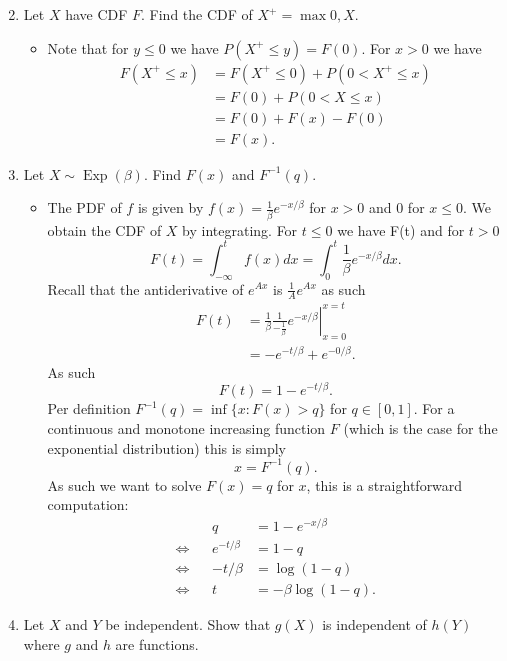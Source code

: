 \documentclass{article}
\begin{document}
\begin{enumerate}
\begin{itemize}
$$			$$
		\end{itemize}
	\item Let $X$ have CDF $F$. Find the CDF of $X^+ = \max{0, X}$.
		\begin{itemize}
			\item Note that for $y \leq 0$ we have $P(X^+ \leq y) = F(0)$. For $x > 0$ we have
			$$
			\begin{aligned}
			F(X^+ \leq x) &= F(X^+ \leq 0) + P(0 < X^+ \leq x) \\
			&= F(0) + P(0 < X \leq x) \\
			&= F(0) + F(x) - F(0) \\
			&= F(x).
			\end{aligned}
			$$
		\end{itemize}
	\item Let $X \sim \operatorname{Exp}(\beta)$. Find $F(x)$ and $F^{-1}(q)$.
		\begin{itemize}
			\item The PDF of $f$ is given by $f(x) = \frac{1}{\beta} e^{- x / \beta}$ for $x > 0$ and $0$ for $x \leq 0$. We obtain the CDF of $X$ by integrating. For $t \leq 0$ we have F(t) and for $t > 0$
			$$
			F(t) = \int_{-\infty}^t f(x) dx = \int_0^t \frac{1}{\beta} e^{-x / \beta} dx.
			$$
			Recall that the antiderivative of $e^{Ax}$ is $\frac{1}{A} e^{Ax}$ as such
			$$
			\begin{aligned}
			F(t) &= \left. \frac{1}{\beta} \frac{1}{-\frac{1}{\beta}} e^{-x / \beta} \right|_{x = 0}^{x = t} \\
			&= - e^{-t / \beta} + e^{-0 / \beta}.
			\end{aligned}
			$$
			As such
			$$
			F(t) = 1 - e^{-t / \beta}.
			$$
			Per definition $F^{-1}(q) = \inf \{x : F(x) > q\}$ for $q \in [0, 1]$. For a continuous and monotone increasing function $F$ (which is the case for the exponential distribution) this is simply
			$$
			x = F^{-1}(q).
			$$
			As such we want to solve $F(x) = q$ for $x$, this is a straightforward computation:
			$$
			\begin{aligned}
			&& q &= 1 - e^{-x / \beta} \\
			\iff&& e^{-t / \beta} &= 1 - q \\
			\iff&& -t/\beta &= \log(1 - q) \\
			\iff&& t &= -\beta \log(1 - q).
			\end{aligned}
			$$
		\end{itemize}
	\item Let $X$ and $Y$ be independent. Show that $g(X)$ is independent of $h(Y)$ where $g$ and $h$ are functions.

\end{enumerate}
\end{document}
